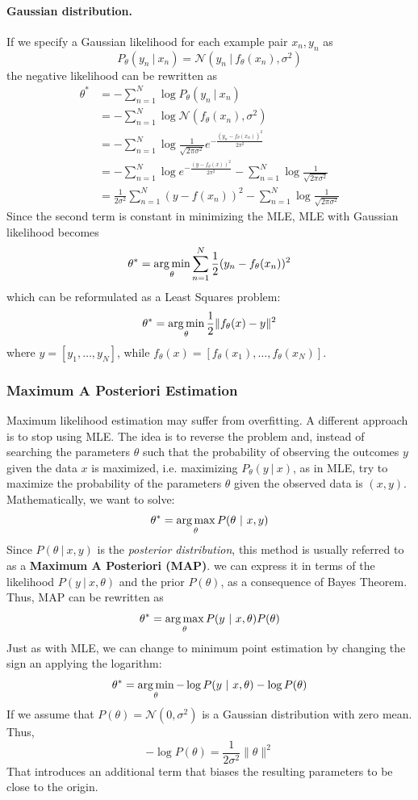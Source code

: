\documentclass{article}
\begin{document}
\paragraph{Gaussian distribution.} If we specify a Gaussian likelihood for
each example pair $x_n,y_n$ as
$$P_\theta(y_n\ |\ x_n)=\mathcal{N}(y_n\ |\ f_{\theta}(x_n),\sigma^2)$$
the negative likelihood can be rewritten as
$$
\begin{aligned}
    \theta^*&=-\displaystyle\sum_{n=1}^{N}\log P_\theta(y_n\ |\ x_n)\\ 
            &=-\displaystyle\sum_{n=1}^{N}\log
            \mathcal{N}(f_\theta(x_n),\sigma^2)\\ 
            &=-\displaystyle\sum_{n=1}^{N}\log
            \frac{1}{\sqrt{2\pi\sigma^2}}e^{-\frac{(y_n-f_\theta(x_n))^2}{2\pi^2}}\\ 
            &=-\displaystyle\sum_{n=1}^{N}\log e^{-\frac{(y-f_\theta(x))^2}{2\pi^2}}-\displaystyle\sum_{n=1}^{N}\log
            \frac{1}{\sqrt{2\pi\sigma^2}}\\ 
            &=
            \frac{1}{2\sigma^2}\displaystyle\sum_{n=1}^{N}(y-f(x_n))^2-\displaystyle\sum_{n=1}^{N}\log
            \frac{1}{\sqrt{2\pi\sigma^2}}
\end{aligned}
$$
Since the second term is constant in minimizing the MLE, MLE with Gaussian
likelihood becomes 
$$\theta^*=\operatorname*{arg\,min}_{\theta}\displaystyle\sum_{n=1}^{N}\frac{1}{2}(y_n-f_\theta(x_n))^2$$
which can be reformulated as a Least Squares problem:
$$\theta^*=\operatorname*{arg\,min}_{\theta}\frac{1}{2}\lVert f_\theta(x)-y\rVert^2$$
where $y=[y_1,\ldots,y_N]$, while
$f_\theta(x)=[f_\theta(x_1),\ldots,f_\theta(x_N)]$.

\subsubsection{Maximum A Posteriori Estimation}
Maximum likelihood estimation may suffer from overfitting. A different
approach is to stop using MLE. The idea is to reverse the problem and, instead
of searching the parameters $\theta$ such that the probability of observing
the outcomes $y$ given the data $x$ is maximized, i.e. maximizing $P_\theta(y\
|\ x)$, as in MLE, try to maximize the probability of the parameters $\theta$
given the observed data is $(x,y)$. Mathematically, we want to solve:
$$\theta^*=\argmax_{\theta}P(\theta\ |\ x,y)$$
Since $P(\theta\ |\ x,y)$ is the \textit{posterior distribution}, this method
is usually referred to as a \textbf{Maximum A Posteriori (MAP)}. we can
express it in terms of the likelihood $P(y\ |\ x,\theta)$ and the prior
$P(\theta)$, as a consequence of Bayes Theorem. Thus, MAP can be rewritten as
$$\theta^*=\argmax_{\theta}P(y\ |\ x,\theta)P(\theta)$$
Just as with MLE, we can change to minimum point estimation by changing the
sign an applying the logarithm:
$$\theta^*=\argmin_{\theta}-\log P(y\ |\ x,\theta)-\log P(\theta)$$
If we assume that $P(\theta)=\mathcal{N}(0,\sigma^2)$ is a Gaussian distribution
with zero mean. Thus,
$$-\log P(\theta)=\frac{1}{2\sigma^2}\lVert\theta\rVert^2$$
That introduces an additional term that biases the resulting parameters to be
close to the origin.
\cleardoublepage
\end{document}
